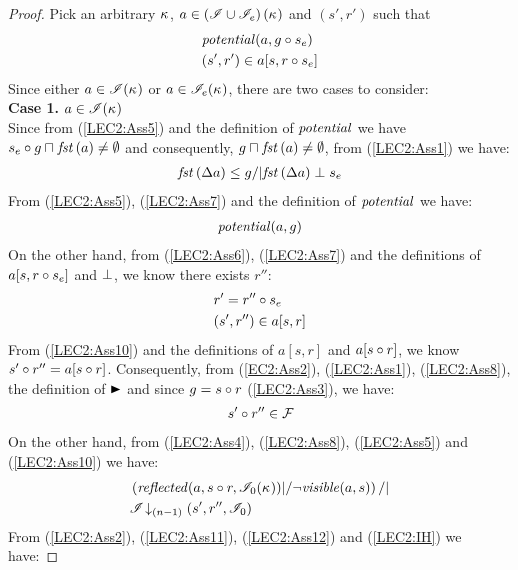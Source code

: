 \begin{lemma}
\begin{proof}
Pick an arbitrary $\kappa_{}$, $a \in \left(\mathscr{I} \cup \mathscr{I}_e \right)(\kappa_{})$ and $(s', r')$ such that
%
\begin{align}
	& \mathit{potential}(a, g \circ s_e) \label{LEC2:Ass5}\\
	& (s', r') \in a[s, r \circ s_e] \label{LEC2:Ass6}
\end{align}
Since either $a \in \mathscr{I}(\kappa_{})$ or $a \in \mathscr{I}_e(\kappa_{})$, there are two cases to consider:\\

\noindent\textbf{Case 1. }$a \in \mathscr{I}(\kappa_{})$\\
Since from (\ref{LEC2:Ass5}) and the definition of $\mathit{potential}$ we have $s_e \circ g \sqcap_{} \mathit{fst}\left(a\right) \not= \emptyset$ and consequently, $g \sqcap_{} \mathit{fst}\left(a\right) \not= \emptyset$, from (\ref{LEC2:Ass1}) we have:
%
\begin{align}
	\mathit{fst}\left(\Delta {a}\right) \leq g /| \mathit{fst}\left(\Delta {a}\right) \mathrel{\bot} s_e \label{LEC2:Ass7}
\end{align}
% 
From (\ref{LEC2:Ass5}), (\ref{LEC2:Ass7}) and the definition of $\mathit{potential}$ we have:
%
\begin{align}
	\mathit{potential}(a, g) \label{LEC2:Ass8}
\end{align}
%
On the other hand, from (\ref{LEC2:Ass6}), (\ref{LEC2:Ass7}) and the definitions of $a[s, r \circ s_e]$ and $\mathrel{\bot}$, we know there exists $r''$: 
%
\begin{align}
	& r' = r'' \circ s_e \label{LEC2:Ass9}\\
	& (s', r'') \in a[s, r]  \label{LEC2:Ass10}
\end{align}
%
From (\ref{LEC2:Ass10}) and the definitions of $a[s, r]$ and $a[s \circ r]$, we know $s' \circ r'' = a[s \circ r]$. Consequently, from (\ref{EC2:Ass2}), (\ref{LEC2:Ass1}), (\ref{LEC2:Ass8}), the definition of $\strictfences$ and since $g = s \circ r$ (\ref{LEC2:Ass3}), we have:
%
\begin{align}
	s' \circ r'' \in \mathcal{F}_{}  \label{LEC2:Ass11}
\end{align}
On the other hand, from (\ref{LEC2:Ass4}), (\ref{LEC2:Ass8}), (\ref{LEC2:Ass5}) and (\ref{LEC2:Ass10}) we have:
%
\begin{align}
	& \left(\mathit{reflected}(a, s \circ r, \mathscr{I}_0(\kappa_{}) ) |/ \neg\mathit{visible}(a, s) \right) /| \label{LEC2:Ass12}\\
	& \mathscr{I} \!\downarrow_{(n-1)} \left(s', r'', \mathscr{I}_0\right) \label{LEC2:Ass13}
\end{align}
%
From (\ref{LEC2:Ass2}), (\ref{LEC2:Ass11}), (\ref{LEC2:Ass12}) and (\ref{LEC2:IH}) we have:

\end{proof}
\end{lemma}
